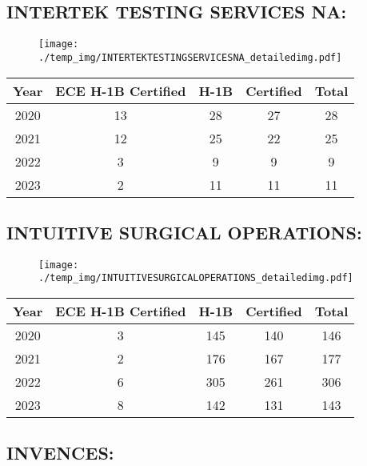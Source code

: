 \documentclass{article}%
\begin{document}
%
\newpage%
\subsection{INTERTEK TESTING SERVICES NA:}%
\label{subsec:INTERTEKTESTINGSERVICESNA}%
\label{INTERTEKTESTINGSERVICESNAdetailed}%


\begin{figure}[htbp]%
\centering%
\texttt{[image: ./temp\_img/INTERTEKTESTINGSERVICESNA\_detailedimg.pdf]}%
\end{figure}

%
\begin{longtable}{c|c|c|c|c}%
\hline%
Year&ECE H{-}1B Certified&H{-}1B&Certified&Total\\%
\hline%
2020&13&28&27&28\\%
\hline%
2021&12&25&22&25\\%
\hline%
2022&3&9&9&9\\%
\hline%
2023&2&11&11&11\\%
\hline%
\end{longtable}

%
\newpage%
\subsection{INTUITIVE SURGICAL OPERATIONS:}%
\label{subsec:INTUITIVESURGICALOPERATIONS}%
\label{INTUITIVESURGICALOPERATIONSdetailed}%


\begin{figure}[htbp]%
\centering%
\texttt{[image: ./temp\_img/INTUITIVESURGICALOPERATIONS\_detailedimg.pdf]}%
\end{figure}

%
\begin{longtable}{c|c|c|c|c}%
\hline%
Year&ECE H{-}1B Certified&H{-}1B&Certified&Total\\%
\hline%
2020&3&145&140&146\\%
\hline%
2021&2&176&167&177\\%
\hline%
2022&6&305&261&306\\%
\hline%
2023&8&142&131&143\\%
\hline%
\end{longtable}

%
\newpage%
\subsection{INVENCES:}%
\label{subsec:INVENCES}%
\label{INVENCESdetailed}%
\end{document}
